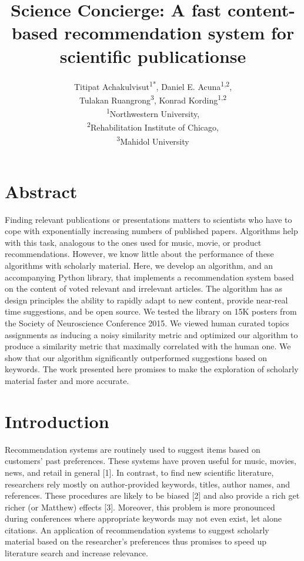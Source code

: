 \documentclass[a4paper]{article}
\title{Science Concierge: A fast content-based recommendation system for scientific publicationse}
\author{Titipat Achakulvisut\textsuperscript{1*}, Daniel E. Acuna\textsuperscript{1,2}, \\  Tulakan Ruangrong\textsuperscript{3}, Konrad Kording\textsuperscript{1,2}\\
\textsuperscript{1}Northwestern University,\\
\textsuperscript{2}Rehabilitation Institute of Chicago, \\
\textsuperscript{3}Mahidol University}
\begin{document}
\maketitle

\section{Abstract}

Finding relevant publications or presentations matters to scientists who have to cope with exponentially increasing numbers of published papers. Algorithms help with this task, analogous to the ones used for music, movie, or product recommendations. However, we know little about the performance of these algorithms with scholarly material. Here, we develop an algorithm, and an accompanying Python library, that implements a recommendation system based on the content of voted relevant and irrelevant articles. The algorithm has as design principles the ability to rapidly adapt to new content, provide near-real time suggestions, and be open source. We tested the library on 15K posters from the Society of Neuroscience Conference 2015. We viewed human curated topics assignments as inducing a noisy similarity metric and optimized our algorithm to produce a similarity metric that maximally correlated with the human one. We show that our algorithm significantly outperformed suggestions based on keywords.  The work presented here promises to make the exploration of scholarly material faster and more accurate.

\section{Introduction}

Recommendation systems are routinely used to suggest items based on customers’ past preferences. These systems have proven useful for music, movies, news, and retail in general [1]. In contrast, to find new scientific literature, researchers rely mostly on author-provided keywords, titles, author names, and references. These procedures are likely to be biased [2] and also provide a rich get richer (or Matthew) effects [3]. Moreover, this problem is more pronounced during conferences where appropriate keywords may not even exist, let alone citations. An application of recommendation systems to suggest scholarly material based on the researcher’s preferences thus promises to speed up literature search and increase relevance.
\end{document}
